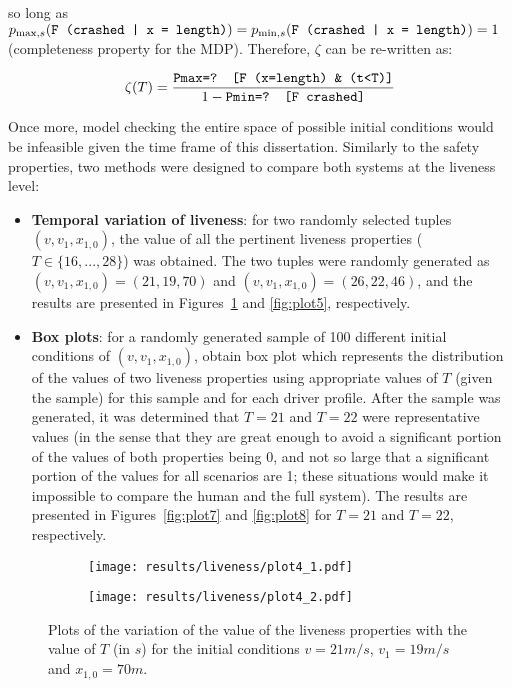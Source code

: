so long as $p_{\max, s} (\text{\texttt{F (crashed | x = length)}}) = p_{\min, s} (\text{\texttt{F (crashed | x = length)}}) = 1$ (completeness property for the MDP). Therefore, $\zeta$ can be re-written as:

\begin{equation}
	\zeta(T) = \frac{\text{\texttt{Pmax=? [F (x=length) \& (t<T)]}}}{1 - \text{\texttt{Pmin=? [F crashed]}}}
\end{equation}

Once more, model checking the entire space of possible initial conditions would be infeasible given the time frame of this dissertation. Similarly to the safety properties, two methods were designed to compare both systems at the liveness level:

\begin{itemize}
	\item \textbf{Temporal variation of liveness}: for two randomly selected tuples $(v, v_1, x_{1,0})$, the value of all the pertinent liveness properties ($T \in \{16,...,28\}$) was obtained. The two tuples were randomly generated as $(v, v_1, x_{1,0}) = (21, 19, 70)$ and $(v, v_1, x_{1,0}) = (26, 22, 46)$, and the results are presented in Figures~\ref{fig:plot4} and \ref{fig:plot5}, respectively.
	\item \textbf{Box plots}: for a randomly generated sample of 100 different initial conditions of $(v, v_1, x_{1,0})$, obtain box plot which represents the distribution of the values of two liveness properties using appropriate values of $T$ (given the sample) for this sample and for each driver profile. After the sample was generated, it was determined that $T=21$ and $T=22$ were representative values (in the sense that they are great enough to avoid a significant portion of the values of both properties being 0, and not so large that a significant portion of the values for all scenarios are 1; these situations would make it impossible to compare the human and the full system). The results are presented in Figures~\ref{fig:plot7} and \ref{fig:plot8} for $T=21$ and $T=22$, respectively.
\end{itemize}

\clearpage

\begin{figure}[H]
\vspace{4em}
\centering
\begin{subfigure}{0.49\textwidth}
  \centering
  \texttt{[image: results/liveness/plot4\_1.pdf]}
\end{subfigure}
\begin{subfigure}{0.49\textwidth}
  \centering
  \texttt{[image: results/liveness/plot4\_2.pdf]}
\end{subfigure} 
\caption{Plots of the variation of the value of the liveness properties with the value of $T$ (in $s$) for the initial conditions $v = 21m/s$, $v_1 = 19m/s$ and $x_{1,0} = 70m$.}
\label{fig:plot4}
\end{figure}

